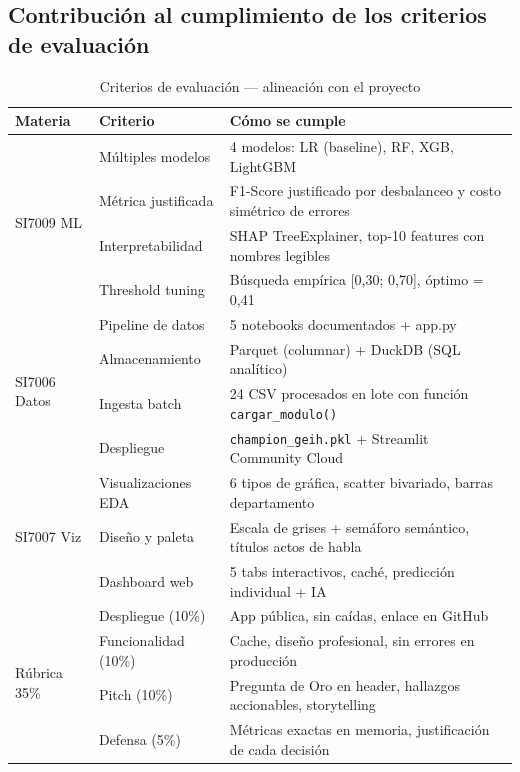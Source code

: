 \documentclass[12pt, a4paper]{article}
\begin{document}
\subsection{Contribución al cumplimiento de los criterios de evaluación}

\begin{table}[H]
\centering
\caption{Criterios de evaluación — alineación con el proyecto}
\label{tab:criterios}
\begin{tabularx}{\textwidth}{llX}
\toprule
\textbf{Materia} & \textbf{Criterio} & \textbf{Cómo se cumple} \\
\midrule
\multirow{4}{*}{SI7009 ML} & Múltiples modelos & 4 modelos: LR (baseline), RF, XGB, LightGBM \\
 & Métrica justificada & F1-Score justificado por desbalanceo y costo simétrico de errores \\
 & Interpretabilidad & SHAP TreeExplainer, top-10 features con nombres legibles \\
 & Threshold tuning & Búsqueda empírica [0{,}30; 0{,}70], óptimo = 0{,}41 \\
\midrule
\multirow{4}{*}{SI7006 Datos} & Pipeline de datos & 5 notebooks documentados + app.py \\
 & Almacenamiento & Parquet (columnar) + DuckDB (SQL analítico) \\
 & Ingesta batch & 24 CSV procesados en lote con función \texttt{cargar\_modulo()} \\
 & Despliegue & \texttt{champion\_geih.pkl} + Streamlit Community Cloud \\
\midrule
\multirow{3}{*}{SI7007 Viz} & Visualizaciones EDA & 6 tipos de gráfica, scatter bivariado, barras departamento \\
 & Diseño y paleta & Escala de grises + semáforo semántico, títulos actos de habla \\
 & Dashboard web & 5 tabs interactivos, caché, predicción individual + IA \\
\midrule
\multirow{4}{*}{Rúbrica 35\%} & Despliegue (10\%) & App pública, sin caídas, enlace en GitHub \\
 & Funcionalidad (10\%) & Cache, diseño profesional, sin errores en producción \\
 & Pitch (10\%) & Pregunta de Oro en header, hallazgos accionables, storytelling \\
 & Defensa (5\%) & Métricas exactas en memoria, justificación de cada decisión \\
\bottomrule
\end{tabularx}
\end{table}
\end{document}
